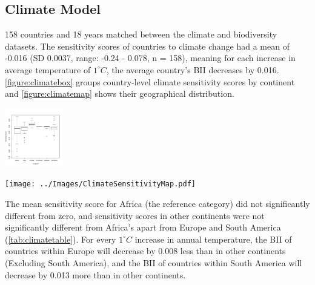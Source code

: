 \documentclass[11pt, a4paper, titlepage]{article}
\begin{document}
	\subsection*{Climate Model}
	
	158 countries and 18 years matched between the climate and biodiversity datasets. The sensitivity scores of countries to climate change had a mean of -0.016 (SD 0.0037, range: -0.24 - 0.078, n = 158), meaning for each increase in average temperature of $1^\circ C$, the average country's BII decreases by 0.016. \autoref{figure:climatebox} groups  country-level climate sensitivity scores by continent and \autoref{figure:climatemap} shows their geographical distribution. 

	\begin{center}
		\includegraphics[width=1in]{../Images/ClimateSensitivityBoxplot.pdf}
		\label{figure:climatebox}
		
		\texttt{[image: ../Images/ClimateSensitivityMap.pdf]}
		\label{figure:climatemap}


	\end{center}
	\bigskip
	
	The mean sensitivity score for Africa (the reference category) did not significantly different from zero, and sensitivity scores in other continents were not significantly different from Africa's apart from Europe and South America (\autoref{tab:climatetable}). For every $1^\circ C$ increase in annual temperature, the BII of countries within Europe will decrease by 0.008 less than in other continents (Excluding South America), and the BII of countries within South America will decrease by 0.013 more than in other continents.
\end{document}
